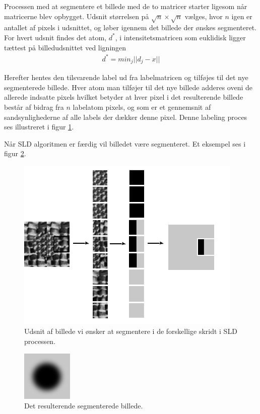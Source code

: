 Processen med at segmentere et billede med de to matricer starter ligesom når matricerne blev opbygget. Udsnit størrelsen på $\sqrt{n}\times\sqrt{n}$ vælges, hvor $n$ igen er antallet af pixels i udsnittet, og løber igennem det billede der ønskes segmenteret. For hvert udsnit findes det atom, $d^*$, i intensitetsmatricen som euklidisk ligger tættest på billedudsnittet ved ligningen
\begin{align}
	d^* = min_j ||d_j-x||
\end{align}

Herefter hentes den tilsvarende label ud fra labelmatricen og tilføjes til det nye segmenterede billede. Hver atom man tilføjer til det nye billede adderes oveni de allerede indsatte pixels hvilket betyder at hver pixel i det resulterende billede består af bidrag fra $n$ labelatom pixels, og som er et gennemsnit af sandsynlighederne af alle labels der dækker denne pixel. Denne labeling proces ses illustreret i figur \ref{fig:postmethod_sld_labelpatch}.  

Når SLD algoritmen er færdig vil billedet være segmenteret. Et eksempel ses i figur \ref{fig:postmethod_sld_resulting}.

\begin{figure}[H]
		\centering
		\includegraphics[scale=0.8]{files/postmethod/img/dict_new2.png}
	\caption{Udsnit af billede vi ønsker at segmentere i de forskellige skridt i SLD processen.\label{fig:postmethod_sld_labelpatch}}
\end{figure}

\begin{figure}[H]
		\centering
		\includegraphics[scale=1]{files/postmethod/img/dict_new3.png}
	\caption{Det resulterende segmenterede billede.\label{fig:postmethod_sld_resulting}}
\end{figure}

